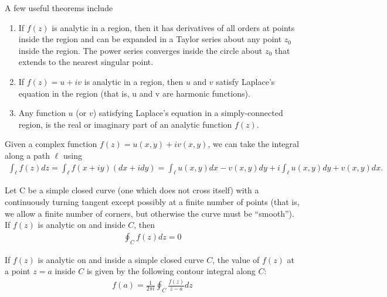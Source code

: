 A few useful theorems \cite{bib:Methods_Of_Theoretical} include 
	\begin{enumerate}
	\item If $f(z)$ is analytic in a region, then it has derivatives of all orders at points inside the region and can be expanded in a Taylor series about any point $z_0$ inside the region.
	The power series converges inside the circle about $z_0$ that extends to the nearest
	singular point. 
	
	\item If $f(z) = u + iv$ is analytic in a region, then $u$ and $v$ satisfy Laplace's equation in the region (that is, u and v are harmonic functions).
		
	\item Any function $u$ (or $v$) satisfying Laplace's equation in a simply-connected region, is the real or imaginary part of an analytic function $f(z)$.
	\end{enumerate}
	Given a complex function $f(z)=u(x,y)+iv(x,y)$, we can take the integral along a path $\ell$ using
	\begin{align}
		\int_\ell f(z) dz = \int_\ell f(x+iy) (dx+idy) = \int_\ell u(x,y)dx - v(x,y)dy + i\int_\ell u(x,y)dy + v(x,y)dx.
	\end{align}
\begin{fancybox}{}
Let C be a simple closed curve (one which does not cross itself) with a continuously turning tangent except possibly at a finite number of points (that is, we allow a finite number of corners, but otherwise the curve must be “smooth”). If $f(z)$ is analytic on and inside $C$, then
\begin{align}
	\oint_C f(z) dz =0
\end{align}
\end{fancybox}

\begin{fancybox}{}
	If $f(z)$ is analytic on and inside a simple closed curve $C$, the value of $f (z)$ at a point $z = a$ inside $C$ is given by the following contour integral along $C$:
	\begin{align}
		f(a) = \frac{1}{2\pi i}\oint_C \frac{f(z)}{z-a}dz	
	\end{align}
\end{fancybox}









